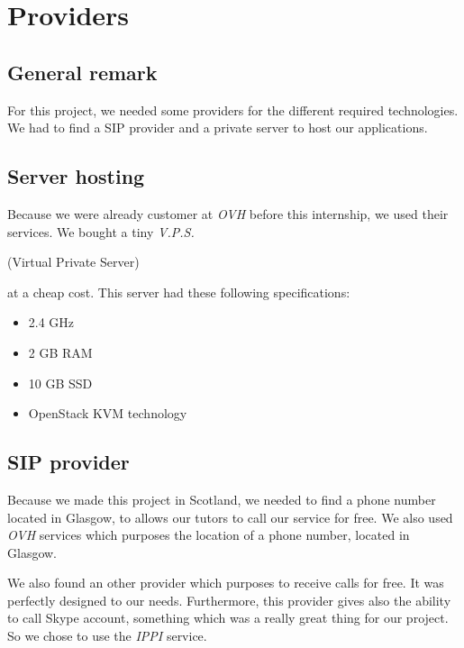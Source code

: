 \chapter{Providers}

\section{General remark}

For this project, we needed some providers for the different required technologies. We had to find a SIP provider and a private server to host our applications. 

\section{Server hosting}

Because we were already customer at \textit{OVH} before this internship, we used their services. We bought a tiny \textit{V.P.S.} \begin{tiny}(Virtual Private Server)\end{tiny} at a cheap cost. This server had these following specifications:
\begin{itemize}  
\item 2.4 GHz
\item 2 GB RAM
\item 10 GB SSD
\item OpenStack KVM technology
\end{itemize}



\section{SIP provider}

Because we made this project in Scotland, we needed to find a phone number located in Glasgow, to allows our tutors to call our service for free. We also used \textit{OVH} services which purposes the location of a phone number, located in Glasgow. 

We also found an other provider which purposes to receive calls for free. It was perfectly designed to our needs. Furthermore, this provider gives also the ability to call Skype account, something which was a really great thing for our project. So we chose to use the \textit{IPPI} service.


\newpage